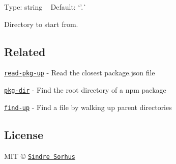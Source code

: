 Type\+: {\ttfamily string} ~\newline
Default\+: `'.\textquotesingle{}\`{}

Directory to start from.

\subsection*{Related}


\begin{DoxyItemize}
\item \href{https://github.com/sindresorhus/read-pkg-up}{\tt read-\/pkg-\/up} -\/ Read the closest package.\+json file
\item \href{https://github.com/sindresorhus/pkg-dir}{\tt pkg-\/dir} -\/ Find the root directory of a npm package
\item \href{https://github.com/sindresorhus/find-up}{\tt find-\/up} -\/ Find a file by walking up parent directories
\end{DoxyItemize}

\subsection*{License}

M\+IT © \href{http://sindresorhus.com}{\tt Sindre Sorhus} 